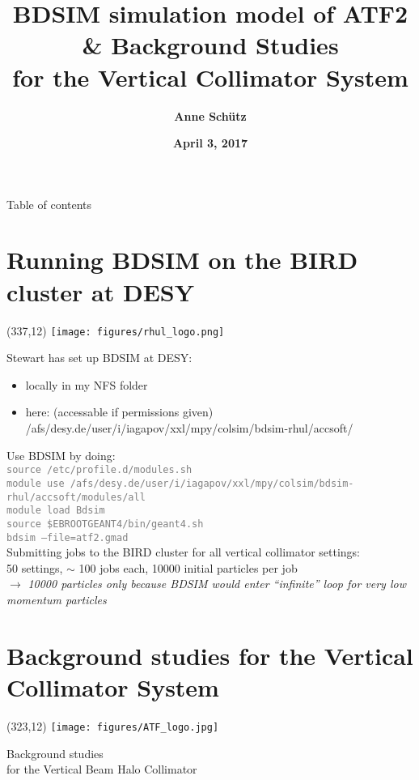 \documentclass[xcolor={dvipsnames}]{beamer}
\title[ATF2 Background Simulations]{\textbf{BDSIM simulation model of ATF2 \& Background Studies\\for the Vertical Collimator System}}
\author{\textbf{Anne Sch\"utz}}
\institute{\textbf{KIT, DESY}}
\date{\textbf{April 3, 2017}}
\newcommand{\ATFlogo}{
  \setlength{\TPHorizModule}{1pt}
  \setlength{\TPVertModule}{1pt}
  \begin{textblock}{1}(323,12)
   \texttt{[image: figures/ATF\_logo.jpg]}
  \end{textblock}
}
\newcommand{\RHULlogo}{
  \setlength{\TPHorizModule}{1pt}
  \setlength{\TPVertModule}{1pt}
  \begin{textblock}{1}(337,12)
   \texttt{[image: figures/rhul\_logo.png]}
  \end{textblock}
}
\begin{document}
{
\begin{frame}
  \titlepage
\end{frame}
}

\begin{frame}{Table of contents}
  \tableofcontents
\end{frame}


\section{Running BDSIM on the BIRD cluster at DESY}
\begin{frame}
\RHULlogo
Stewart has set up BDSIM at DESY:
\begin{itemize}
 \item locally in my NFS folder
 \item here: (accessable if permissions given)\\
 /afs/desy.de/user/i/iagapov/xxl/mpy/colsim/bdsim-rhul/accsoft/
\end{itemize}
\vspace*{0.2cm}
Use BDSIM by doing:\\
\textcolor{Gray}{\texttt{\small source /etc/profile.d/modules.sh\\                                                
module use {\footnotesize /afs/desy.de/user/i/iagapov/xxl/mpy/colsim/bdsim-rhul/accsoft/modules/all}\\
module load Bdsim\\
source \$EBROOTGEANT4/bin/geant4.sh\\
bdsim --file=atf2.gmad
}}\\
\vspace*{0.2cm}
Submitting jobs to the BIRD cluster for all vertical collimator settings:\\
50 settings, $\sim$ 100 jobs each, 10000 initial particles per job\\
$\rightarrow$ \textit{10000 particles only because BDSIM would enter ``infinite'' loop for very low momentum particles}
\end{frame}





\section{Background studies for the Vertical Collimator System}
\begin{frame}
\ATFlogo
 \begin{center}
    \LARGE Background studies\\for the Vertical Beam Halo Collimator
 \end{center}
\end{frame}
\end{document}
